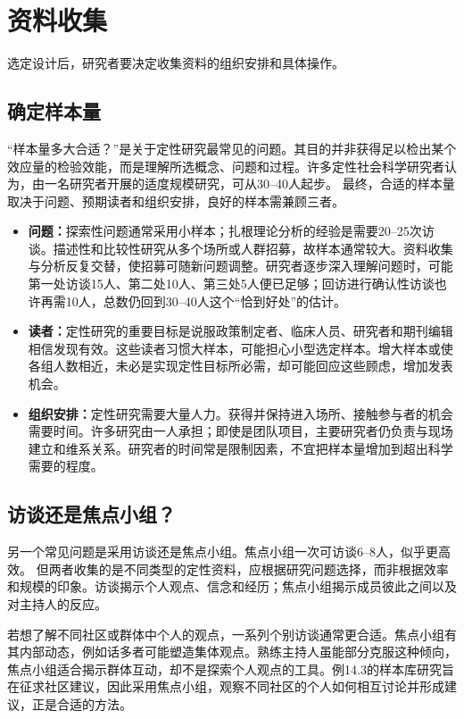 \section{资料收集}
选定设计后，研究者要决定收集资料的组织安排和具体操作。

\subsection{确定样本量}
“样本量多大合适？”是关于定性研究最常见的问题。其目的并非获得足以检出某个效应量的检验效能，而是理解所选概念、问题和过程。许多定性社会科学研究者认为，由一名研究者开展的适度规模研究，可从30--40人起步。
最终，合适的样本量取决于问题、预期读者和组织安排，良好的样本需兼顾三者。
\begin{itemize}
\item \textbf{问题：}探索性问题通常采用小样本；扎根理论分析的经验是需要20--25次访谈。描述性和比较性研究从多个场所或人群招募，故样本通常较大。资料收集与分析反复交替，使招募可随新问题调整。研究者逐步深入理解问题时，可能第一处访谈15人、第二处10人、第三处5人便已足够；回访进行确认性访谈也许再需10人，总数仍回到30--40人这个“恰到好处”的估计。
\item \textbf{读者：}定性研究的重要目标是说服政策制定者、临床人员、研究者和期刊编辑相信发现有效。这些读者习惯大样本，可能担心小型选定样本。增大样本或使各组人数相近，未必是实现定性目标所必需，却可能回应这些顾虑，增加发表机会。
\item \textbf{组织安排：}定性研究需要大量人力。获得并保持进入场所、接触参与者的机会需要时间。许多研究由一人承担；即使是团队项目，主要研究者仍负责与现场建立和维系关系。研究者的时间常是限制因素，不宜把样本量增加到超出科学需要的程度。
\end{itemize}

\subsection{访谈还是焦点小组？}
另一个常见问题是采用访谈还是焦点小组。焦点小组一次可访谈6--8人，似乎更高效。
但两者收集的是不同类型的定性资料，应根据研究问题选择，而非根据效率和规模的印象。访谈揭示个人观点、信念和经历；焦点小组揭示成员彼此之间以及对主持人的反应。

若想了解不同社区或群体中个人的观点，一系列个别访谈通常更合适。焦点小组有其内部动态，例如话多者可能塑造集体观点。熟练主持人虽能部分克服这种倾向，焦点小组适合揭示群体互动，却不是探索个人观点的工具。例14.3的样本库研究旨在征求社区建议，因此采用焦点小组，观察不同社区的个人如何相互讨论并形成建议，正是合适的方法。

